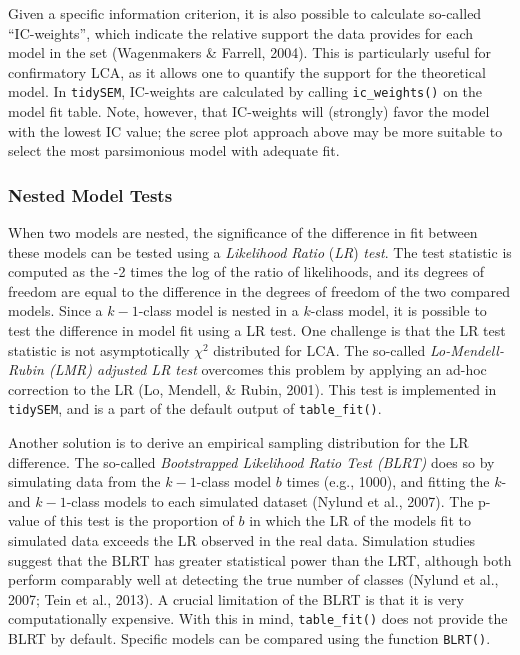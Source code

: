 \documentclass[
  ,man,floatsintext]{apa6}
\begin{document}
Given a specific information criterion, it is also possible to calculate so-called ``IC-weights'',
which indicate the relative support the data provides for each model in the set (Wagenmakers \& Farrell, 2004).
This is particularly useful for confirmatory LCA,
as it allows one to quantify the support for the theoretical model.
In \texttt{tidySEM}, IC-weights are calculated by calling \texttt{ic\_weights()} on the model fit table.
Note, however, that IC-weights will (strongly) favor the model with the lowest IC value;
the scree plot approach above may be more suitable to select the most parsimonious model with adequate fit.

\hypertarget{nested-model-tests}{%
\subsubsection{Nested Model Tests}\label{nested-model-tests}}

When two models are nested, the significance of the difference in fit between these models can be tested using a \emph{Likelihood Ratio} (\emph{LR}) \emph{test}.
The test statistic is computed as the -2 times the log of the ratio of likelihoods,
and its degrees of freedom are equal to the difference in the degrees of freedom of the two compared models.
Since a \(k-1\)-class model is nested in a \(k\)-class model,
it is possible to test the difference in model fit using a LR test.
One challenge is that the LR test statistic is not asymptotically \(\chi^2\) distributed for LCA.
The so-called \emph{Lo-Mendell-Rubin (LMR) adjusted LR test} overcomes this problem by applying an ad-hoc correction to the LR (Lo, Mendell, \& Rubin, 2001).
This test is implemented in \texttt{tidySEM}, and is a part of the default output of \texttt{table\_fit()}.

Another solution is to derive an empirical sampling distribution for the LR difference.
The so-called \emph{Bootstrapped Likelihood Ratio Test (BLRT)} does so by simulating data from the \(k-1\)-class model \(b\) times (e.g., 1000),
and fitting the \(k\)- and \(k-1\)-class models to each simulated dataset (Nylund et al., 2007).
The p-value of this test is the proportion of \(b\) in which the LR of the models fit to simulated data exceeds the LR observed in the real data.
Simulation studies suggest that the BLRT has greater statistical power than the LRT,
although both perform comparably well at detecting the true number of classes (Nylund et al., 2007; Tein et al., 2013).
A crucial limitation of the BLRT is that it is very computationally expensive.
With this in mind, \texttt{table\_fit()} does not provide the BLRT by default.
Specific models can be compared using the function \texttt{BLRT()}.
\end{document}
